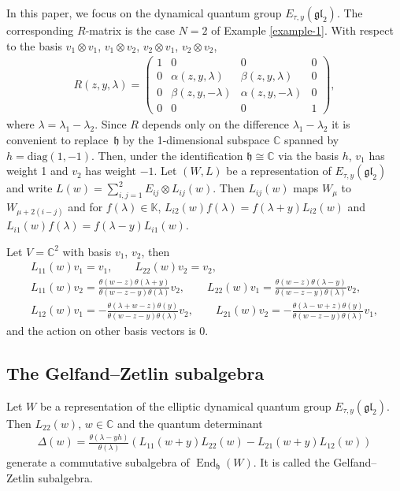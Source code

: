 \documentclass[10pt,a4paper]{amsart}
\numberwithin{equation}{section}
\begin{document}
In this paper, we focus on the dynamical quantum group $E_{\tau,y}(\mathfrak{gl}_2)$. The corresponding $R$-matrix is the case $N=2$ of Example \ref{example-1}. With respect to the basis $v_1\otimes v_1$, $v_1\otimes v_2$, $v_2\otimes v_1$, $v_2\otimes v_2$,
\begin{gather*}
R(z,y,\lambda)= \left(
 \begin{matrix}
 1 & 0 & 0 & 0\\
 0 & \alpha(z,y,\lambda) & \beta(z,y,\lambda) & 0\\
 0 & \beta(z,y,-\lambda) & \alpha(z,y,-\lambda) & 0\\
 0 & 0 & 0& 1
 \end{matrix} \right),
\end{gather*}
where $\lambda=\lambda_1-\lambda_2$. Since $R$ depends only on the difference $\lambda_1-\lambda_2$ it is convenient to replace~$\mathfrak h$ by the 1-dimensional subspace $\mathbb C$ spanned by $h=\mathrm{diag}(1,-1)$. Then, under the identification $\mathfrak h\cong \mathbb C$ via the basis $h$, $v_1$ has weight 1 and $v_2$ has weight $-1$. Let $(W,L)$ be a representation of $E_{\tau,y}(\mathfrak {gl}_2)$ and write $L(w)=\sum\limits_{i,j=1}^2 E_{ij}\otimes L_{ij}(w)$. Then $L_{ij}(w)$ maps $W_\mu$ to $W_{\mu+2(i-j)}$ and for $f(\lambda)\in \mathbb K$, $L_{i2}(w)f(\lambda) =f(\lambda+y)L_{i2}(w)$ and $L_{i1}(w)f(\lambda) =f(\lambda-y)L_{i1}(w)$.
\begin{Example} \label{example-2}Let $V=\mathbb C^2$ with basis $v_1$, $v_2$, then
 \begin{gather*}
 L_{11}(w)v_1=v_1,\qquad L_{22}(w)v_2=v_2,\\
 L_{11}(w)v_2= \frac {\theta(w-z)\theta(\lambda+y)} {\theta(w-z-y)\theta(\lambda)} v_2,\qquad
 L_{22}(w)v_1= \frac {\theta(w-z)\theta(\lambda-y)} {\theta(w-z-y)\theta(\lambda)} v_2,\\
 L_{12}(w)v_1 =-\frac{\theta(\lambda+w-z)\theta(y)} {\theta(w-z-y)\theta(\lambda)} v_2, \qquad
L_{21}(w)v_2=-\frac{\theta(\lambda-w+z)\theta(y)} {\theta(w-z-y)\theta(\lambda)} v_1,
 \end{gather*}
and the action on other basis vectors is 0.
\end{Example}

\subsection{The Gelfand--Zetlin subalgebra}
Let $W$ be a representation of the elliptic dynamical quantum group $E_{\tau,y}(\mathfrak{gl}_2)$. Then $L_{22}(w)$, $w\in\mathbb C$ and the quantum determinant \cite{FelderVarchenko}
\begin{gather}\label{e-determinant1}
 \Delta(w)=\frac{\theta(\lambda-y h)}{\theta(\lambda)} (L_{11}(w+y)L_{22}(w)-L_{21}(w+y)L_{12}(w))
\end{gather}
generate a commutative subalgebra of $\operatorname{End}_{\mathfrak h}(W)$. It is called the Gelfand--Zetlin subalgebra.
\end{document}
